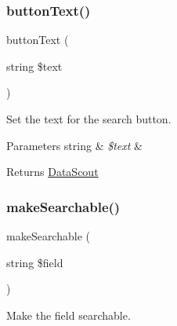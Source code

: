 \subsubsection{\texorpdfstring{button\+Text()}{buttonText()}}
{\footnotesize\ttfamily button\+Text (\begin{DoxyParamCaption}\item[{string}]{\$text }\end{DoxyParamCaption})}

Set the text for the search button.


\begin{DoxyParams}[1]{Parameters}
string & {\em \$text} & \\
\hline
\end{DoxyParams}
\begin{DoxyReturn}{Returns}
\hyperlink{classhamburgscleanest_1_1_data_tables_1_1_models_1_1_data_components_1_1_data_scout}{Data\+Scout} 
\end{DoxyReturn}
\mbox{\label{classhamburgscleanest_1_1_data_tables_1_1_models_1_1_data_components_1_1_data_scout_a24951165ffdc4b878efb2cc17748dea7}} 
\subsubsection{\texorpdfstring{make\+Searchable()}{makeSearchable()}}
{\footnotesize\ttfamily make\+Searchable (\begin{DoxyParamCaption}\item[{string}]{\$field }\end{DoxyParamCaption})}

Make the field searchable.


